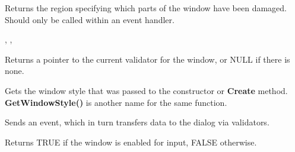 

\label{wxwindowgetupdateregion}


Returns the region specifying which parts of the window have been damaged. Should
only be called within an  event handler.


, , 

\label{wxwindowgetvalidator}


Returns a pointer to the current validator for the window, or NULL if there is none.

\label{wxwindowgetwindowstyleflag}


Gets the window style that was passed to the constructor or {\bf Create}
method. {\bf GetWindowStyle()} is another name for the same function.

\label{wxwindowinitdialog}


Sends an  event, which
in turn transfers data to the dialog via validators.



\label{wxwindowisenabled}


Returns TRUE if the window is enabled for input, FALSE otherwise.



\label{wxwindowisexposed}


